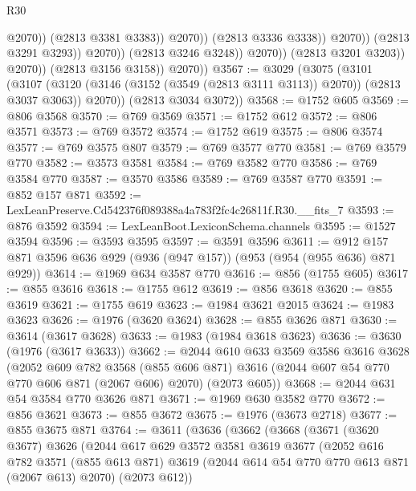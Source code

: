 \begin{lexlean}{R30}
\begin{coremodule}
                                            @2070))
                                        (@2813 @3381 @3383))
                                      @2070))
                                  (@2813 @3336 @3338))
                                @2070))
                            (@2813 @3291 @3293))
                          @2070))
                      (@2813 @3246 @3248))
                    @2070))
                (@2813 @3201 @3203))
              @2070))
          (@2813 @3156 @3158))
        @2070))
@3567 := @3029
    (@3075
      (@3101
        (@3107 (@3120 (@3146 (@3152 (@3549 (@2813 @3111 @3113)) @2070)) (@2813 @3037 @3063)) @2070))
      (@2813 @3034 @3072))
@3568 := @1752 @605
@3569 := @806 @3568
@3570 := @769 @3569
@3571 := @1752 @612
@3572 := @806 @3571
@3573 := @769 @3572
@3574 := @1752 @619
@3575 := @806 @3574
@3577 := @769 @3575 @807
@3579 := @769 @3577 @770
@3581 := @769 @3579 @770
@3582 := @3573 @3581
@3584 := @769 @3582 @770
@3586 := @769 @3584 @770
@3587 := @3570 @3586
@3589 := @769 @3587 @770
@3591 := @852 @157 @871
@3592 := LexLeanPreserve.Cd542376f089388a4a783f2fc4c26811f.R30.__fits_7
@3593 := @876 @3592
@3594 := LexLeanBoot.LexiconSchema.channels
@3595 := @1527 @3594
@3596 := @3593 @3595
@3597 := @3591 @3596
@3611 := @912 @157 @871 @3596 @636 @929 (@936 (@947 @157)) (@953 (@954 (@955 @636) @871 @929))
@3614 := @1969 @634 @3587 @770
@3616 := @856 (@1755 @605)
@3617 := @855 @3616
@3618 := @1755 @612
@3619 := @856 @3618
@3620 := @855 @3619
@3621 := @1755 @619
@3623 := @1984 @3621 @2015
@3624 := @1983 @3623
@3626 := @1976 (@3620 @3624)
@3628 := @855 @3626 @871
@3630 := @3614 (@3617 @3628)
@3633 := @1983 (@1984 @3618 @3623)
@3636 := @3630 (@1976 (@3617 @3633))
@3662 := @2044
    @610
    @633
    @3569
    @3586
    @3616
    @3628
    (@2052
      @609
      @782
      @3568
      (@855 @606 @871)
      @3616
      (@2044 @607 @54 @770 @770 @606 @871 (@2067 @606) @2070)
      (@2073 @605))
@3668 := @2044 @631 @54 @3584 @770 @3626 @871
@3671 := @1969 @630 @3582 @770
@3672 := @856 @3621
@3673 := @855 @3672
@3675 := @1976 (@3673 @2718)
@3677 := @855 @3675 @871
@3764 := @3611
    (@3636
      (@3662
        (@3668
          (@3671
            (@3620 @3677)
            @3626
            (@2044
              @617
              @629
              @3572
              @3581
              @3619
              @3677
              (@2052
                @616
                @782
                @3571
                (@855 @613 @871)
                @3619
                (@2044 @614 @54 @770 @770 @613 @871 (@2067 @613) @2070)
                (@2073 @612))

\end{coremodule}
\end{lexlean}
